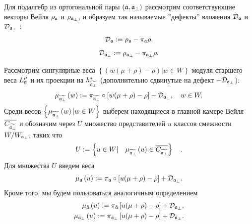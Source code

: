 \documentclass[14pt,autoref,href,facsimile
]{disser}
\begin{document}
Для подалгебр из ортогональной пары  $\left( \mathfrak{a},\mathfrak{a}_{\perp}\right) $ рассмотрим соответствующие векторы Вейля $\rho _{\mathfrak{a}}$ и $\rho _{\mathfrak{a}_{\perp }}$, и образуем так называемые  ''дефекты'' вложения $\mathcal{D}_{\mathfrak{a}}$ и $\mathcal{D}_{\mathfrak{a}_{\perp }}$ :
\begin{equation}
\mathcal{D}_{\mathfrak{a}}:=\rho _{\mathfrak{a}}-\pi _{\mathfrak{a}}\rho ,
\end{equation}
\begin{equation}
\label{defect-perp}
\mathcal{D}_{\mathfrak{a}_{\perp }}:=\rho _{\mathfrak{a}_{\perp }}-\pi_{\mathfrak{a}_{\perp}}\rho .
\end{equation}

Рассмотрим сингулярные веса  $\left\{\left( w(\mu +\rho )-\rho \right)|w  \in W \right\}$  модуля старшего веса  $L_{\mathfrak{g}}^{\mu }$ и их проекции на $h_{\widetilde{\mathfrak{a}_{\perp }}}^{\ast }$ (дополнительно сдвинутые на дефект $-\mathcal{D}_{\mathfrak{a}_{\perp }}$):
\begin{equation*}
\mu _{\widetilde{\af_{\perp }}}\left( w\right) :=\pi _{\widetilde{\frak{%
a}_{\perp }}}\circ\left[ w(\mu +\rho )-\rho \right] -\mathcal{D}_{\af_{\perp
}},\quad w\in W.
\end{equation*}
Среди весов  $\left\{\mu _{\widetilde{\mathfrak{a}_{\perp }}}\left( w\right)|w\in W\right\}$ выберем находящиеся в главной камере Вейля $\overline{C_{\widetilde{\mathfrak{a}_{\perp}}}}$ и обозначим через $U$ множество представителей $u$ классов смежности $W/W_{\mathfrak{a}_{\perp }}$, таких что
\begin{equation}
U:=\left\{ u\in W|\quad \mu _{\widetilde{\mathfrak{a}_{\perp }}}\left( u\right)
\in \overline{C_{\widetilde{\mathfrak{a}_{\perp }}}}\right\} \quad .
\label{U-def}
\end{equation}
Для множества  $U$ введем веса
\begin{equation*}
\mu _{\af}\left( u\right) :=\pi _{\af}\circ\left[ u(\mu +\rho )-\rho %
\right] +\mathcal{D}_{\af_{\perp }}.
\end{equation*}
Кроме того, мы будем пользоваться аналогичным определением
\begin{eqnarray}
\label{eq:136}
\mu _{\tilde {\mathfrak{a}}}\left( u\right) :=\pi _{\tilde {\mathfrak{a}}}\left[ u(\mu +\rho )-\rho \right] +\mathcal{D}_{\mathfrak{a}_{\perp}},\\
\mu _{\mathfrak{a}_{\perp}}\left( u\right) :=\pi _{\mathfrak{a}_{\perp}}\left[ u(\mu +\rho )-\rho \right] +\mathcal{D}_{\mathfrak{a}_{\perp}}.
\end{eqnarray}
\end{document}

